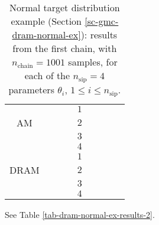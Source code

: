 \begin{table}[h!]
\begin{center}
\begin{tabular}{|c|c|c|c|c|c|c|c|c|}
\hline
\hline
       &          &                        &                        & $1$ &                          &                                &                        &                               \\
\cline{5-9}
AM     &          &                        &                        & $2$ &                          &                                &                        &                               \\
\cline{5-9}
       &          &                        &                        & $3$ &                          &                                &                        &                               \\
\cline{5-9}
       &          &                        &                        & $4$ &                          &                                &                        &                               \\
\hline
\hline
       &          &                        &                        & $1$ &                          &                                &                        &                               \\
\cline{5-9}
DRAM   &          &                        &                        & $2$ &                          &                                &                        &                               \\
\cline{5-9}
       &          &                        &                        & $3$ &                          &                                &                        &                               \\
\cline{5-9}
       &          &                        &                        & $4$ &                          &                                &                        &                               \\
\hline
\end{tabular}
\caption{Normal target distribution example (Section \ref{sc-gmc-dram-normal-ex}):
results from the first chain, with $n_{\text{chain}}=1001$ samples,
for each of the $n_{\text{sip}}=4$ parameters $\theta_i$, $1\leqslant i\leqslant n_{\text{sip}}$.
}
\label{tab-dram-normal-ex-results-1}
\end{center}
\end{table}

See Table \ref{tab-dram-normal-ex-results-2}.

